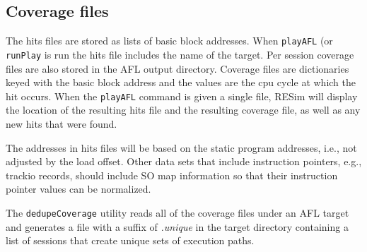 \documentclass[titlepage]{article}
\begin{document}
\subsection{Coverage files}
The hits files are stored as lists of basic block addresses.  When {\tt playAFL} (or {\tt runPlay} is run the hits
file includes the name of the target.  Per session coverage files are also stored in the AFL output
directory.  Coverage files are dictionaries keyed with the basic block address and the values are the
cpu cycle at which the hit occurs.  When the {\tt playAFL} command is given a single file, RESim will
display the location of the resulting hits file and the resulting coverage file, as well as any new
hits that were found.

The addresses in hits files will be based on the static program addresses, i.e., not adjusted
by the load offset.  Other data sets that include instruction pointers, e.g., trackio records, 
should include SO map information so that their instruction pointer values can be normalized.

The {\tt dedupeCoverage} utility reads all of the coverage files under an AFL target and generates
a file with a suffix of \textit{.unique} in the target directory containing a list of sessions that
create unique sets of execution paths.
\end{document}
